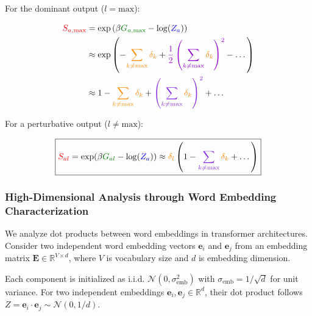 \documentclass[a4paper]{article}
\theoremstyle{plain}
\theoremstyle{definition}
\theoremstyle{remark}
\begin{document}
For the dominant output ($l=\text{max}$):

\begin{align}
\textcolor{red}{S_{a, \text{max}}} &= \exp\left(\beta \textcolor{greencolor}{G_{a, \text{max}}} - \log(\textcolor{blue}{Z_a})\right) \\
&\approx \exp\left( - \textcolor{insightcolor}{\sum_{k \neq \text{max}} \textcolor{orange}{\delta_k}} + \textcolor{k3color}{\frac{1}{2}\left(\sum_{k \neq \text{max}} \textcolor{orange}{\delta_k}\right)^2} - \dots \right) \\
&\approx 1 - \textcolor{insightcolor}{\sum_{k \neq \text{max}} \textcolor{orange}{\delta_k}} + \textcolor{methodcolor}{\left(\sum_{k \neq \text{max}} \textcolor{orange}{\delta_k}\right)^2} + \dots \label{eq:dominant_softmax}
\end{align}

For a perturbative output ($l \neq \text{max}$):

\begin{equation}
\boxed{\textcolor{red}{S_{al}} = \exp(\beta \textcolor{greencolor}{G_{al}} - \log(\textcolor{blue}{Z_a})) \approx \textcolor{orange}{\delta_l} \left(1 - \textcolor{methodcolor}{\sum_{k \neq \text{max}} \textcolor{orange}{\delta_k}} + \dots \right)} \label{eq:perturbative_softmax}
\end{equation}





\subsubsection{High-Dimensional Analysis through Word Embedding Characterization}

We analyze dot products between word embeddings in transformer architectures. Consider two independent word embedding vectors $\mathbf{e}_i$ and $\mathbf{e}_j$ from an embedding matrix $\mathbf{E} \in \mathbb{R}^{V \times d}$, where $V$ is vocabulary size and $d$ is embedding dimension.

Each component is initialized as i.i.d. $\mathcal{N}(0, \sigma_{\text{emb}}^2)$ with $\sigma_{\text{emb}} = 1/\sqrt{d}$ for unit variance. For two independent embeddings $\mathbf{e}_i, \mathbf{e}_j \in \mathbb{R}^d$, their dot product follows $Z = \mathbf{e}_i \cdot \mathbf{e}_j \sim \mathcal{N}(0, 1/d)$.
\end{document}
